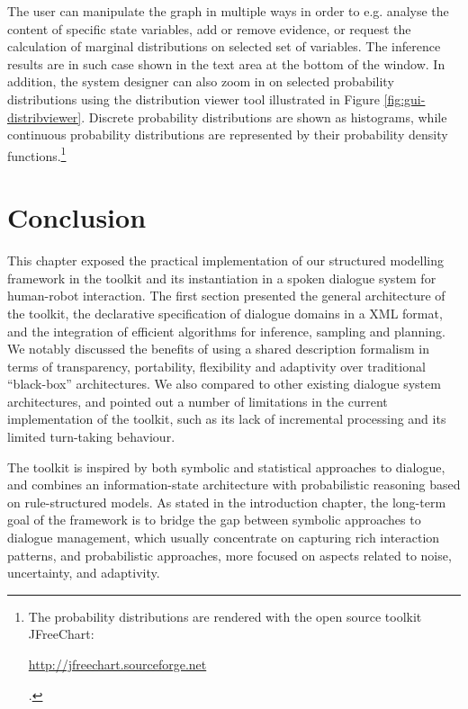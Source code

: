 The user can manipulate the graph in multiple ways in order to e.g. analyse the content of specific state variables, add or remove evidence, or request the calculation of marginal distributions on selected set of variables.  The inference results are in such case shown in the text area at the bottom of the window.  In addition, the system designer can also zoom in on selected probability distributions using the distribution viewer tool illustrated in Figure \ref{fig:gui-distribviewer}. Discrete probability distributions are shown as histograms, while continuous probability distributions are represented by their probability density functions.\footnote{The probability distributions are rendered with the open source toolkit JFreeChart: \begin{scriptsize}\url{http://jfreechart.sourceforge.net}\end{scriptsize}.} 


\section{Conclusion}

This chapter exposed the practical implementation of our structured modelling framework in the \opendial toolkit and its instantiation in a spoken dialogue system for human-robot interaction. The first section presented the general architecture of the toolkit, the declarative specification of dialogue domains in a XML format, and the integration of efficient algorithms for inference, sampling and planning. We notably discussed the benefits of using a shared description formalism in terms of transparency, portability, flexibility and adaptivity over traditional ``black-box'' architectures. We also compared \opendial to other existing dialogue system architectures, and pointed out a number of limitations in the current implementation of the toolkit, such as its lack of incremental processing and its limited turn-taking behaviour. 

The \opendial toolkit is inspired by both symbolic and statistical approaches to dialogue, and combines an information-state architecture with probabilistic reasoning based on rule-structured models.  As stated in the introduction chapter, the long-term goal of the \opendial framework is to bridge the gap between symbolic approaches to dialogue management, which usually concentrate on capturing rich interaction patterns, and probabilistic approaches, more focused on aspects related to noise, uncertainty, and adaptivity. 

